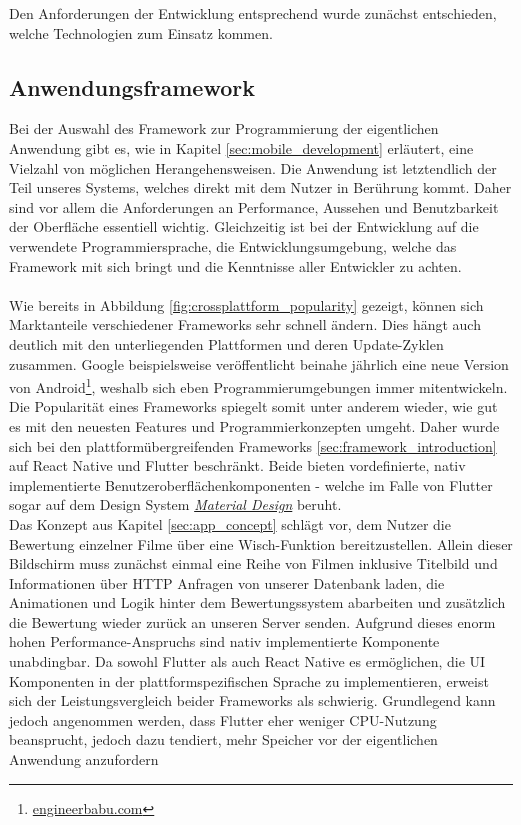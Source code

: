 Den Anforderungen der Entwicklung entsprechend wurde zunächst entschieden, welche Technologien zum Einsatz kommen. 

\subsection{Anwendungsframework}
Bei der Auswahl des Framework zur Programmierung der eigentlichen Anwendung gibt es, wie in Kapitel \ref{sec:mobile_development} erläutert, eine Vielzahl von möglichen Herangehensweisen.
Die Anwendung ist letztendlich der Teil unseres Systems, welches direkt mit dem Nutzer in Berührung kommt.
Daher sind vor allem die Anforderungen an Performance, Aussehen und Benutzbarkeit der Oberfläche essentiell wichtig.
Gleichzeitig ist bei der Entwicklung auf die verwendete Programmiersprache, die Entwicklungsumgebung, welche das Framework mit sich bringt und die Kenntnisse aller Entwickler zu achten.\\
\\
Wie bereits in Abbildung \ref{fig:crossplattform_popularity} gezeigt, können sich Marktanteile verschiedener Frameworks sehr schnell ändern. 
Dies hängt auch deutlich mit den unterliegenden Plattformen und deren Update-Zyklen zusammen.
Google beispielsweise veröffentlicht beinahe jährlich eine neue Version von Android\footnote{\href{https://engineerbabu.com/blog/evolution-of-android-versions/}{engineerbabu.com}}, weshalb sich eben Programmierumgebungen immer mitentwickeln.
Die Popularität eines Frameworks spiegelt somit unter anderem wieder, wie gut es mit den neuesten Features und Programmierkonzepten umgeht. 
Daher wurde sich bei den plattformübergreifenden Frameworks \ref{sec:framework_introduction} auf React Native und Flutter beschränkt. 
Beide bieten vordefinierte, nativ implementierte Benutzeroberflächenkomponenten - welche im Falle von Flutter sogar auf dem Design System \href{https://material.io/}{\textit{Material Design}} beruht.\\
Das Konzept aus Kapitel \ref{sec:app_concept} schlägt vor, dem Nutzer die Bewertung einzelner Filme über eine Wisch-Funktion bereitzustellen.
Allein dieser Bildschirm muss zunächst einmal eine Reihe von Filmen inklusive Titelbild und Informationen über HTTP Anfragen von unserer Datenbank laden, die Animationen und Logik hinter dem Bewertungssystem abarbeiten und zusätzlich die Bewertung wieder zurück an unseren Server senden.
Aufgrund dieses enorm hohen Performance-Anspruchs sind nativ implementierte Komponente unabdingbar.
Da sowohl Flutter als auch React Native es ermöglichen, die UI Komponenten in der plattformspezifischen Sprache zu implementieren, erweist sich der Leistungsvergleich beider Frameworks als schwierig.
Grundlegend kann jedoch angenommen werden, dass Flutter eher weniger CPU-Nutzung beansprucht, jedoch dazu tendiert, mehr Speicher vor der eigentlichen Anwendung anzufordern\cite{bjorn-hansen2020}

